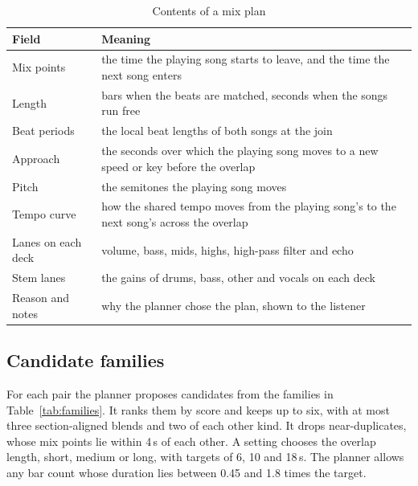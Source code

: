 \documentclass[conference,a4paper]{IEEEtran}
\begin{document}
\begin{table}[t]
\caption{Contents of a mix plan}
\label{tab:plan}
\centering\footnotesize
\begin{tabular}{@{}>{\raggedright\arraybackslash}p{2.3cm}>{\raggedright\arraybackslash}p{5.6cm}@{}}
\toprule
Field & Meaning\\
\midrule
Mix points & the time the playing song starts to leave, and the time the next song enters\\
Length & bars when the beats are matched, seconds when the songs run free\\
Beat periods & the local beat lengths of both songs at the join\\
Approach & the seconds over which the playing song moves to a new speed or key before the overlap\\
Pitch & the semitones the playing song moves\\
Tempo curve & how the shared tempo moves from the playing song's to the next song's across the overlap\\
Lanes on each deck & volume, bass, mids, highs, high-pass filter and echo\\
Stem lanes & the gains of drums, bass, other and vocals on each deck\\
Reason and notes & why the planner chose the plan, shown to the listener\\
\bottomrule
\end{tabular}
\end{table}

\subsection{Candidate families}
For each pair the planner proposes candidates from the families in Table~\ref{tab:families}. It
ranks them by score and keeps up to six, with at most three section-aligned blends and two of each
other kind. It drops near-duplicates, whose mix points lie within 4\,s of each other. A setting
chooses the overlap length, short, medium or long, with targets of 6, 10 and 18\,s. The planner
allows any bar count whose duration lies between 0.45 and 1.8 times the target.
\end{document}

